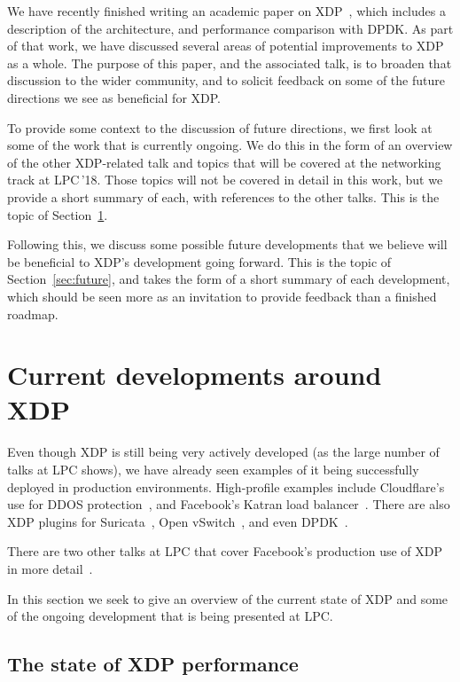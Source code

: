 \documentclass[sigconf]{acmart}
\begin{document}
We have recently finished writing an academic paper on XDP~\cite{xdp-paper},
which includes a description of the architecture, and performance comparison
with DPDK. As part of that work, we have discussed several areas of potential
improvements to XDP as a whole. The purpose of this paper, and the associated
talk, is to broaden that discussion to the wider community, and to solicit
feedback on some of the future directions we see as beneficial for XDP.

To provide some context to the discussion of future directions, we first look at
some of the work that is currently ongoing. We do this in the form of an
overview of the other XDP-related talk and topics that will be covered at the
networking track at LPC\,'18. Those topics will not be covered in detail in this
work, but we provide a short summary of each, with references to the other
talks. This is the topic of Section~\ref{sec:current}.

Following this, we discuss some possible future developments that we believe
will be beneficial to XDP's development going forward. This is the topic of
Section~\ref{sec:future}, and takes the form of a short summary of each
development, which should be seen more as an invitation to provide feedback than
a finished roadmap.

\section{Current developments around XDP}
\label{sec:current}

Even though XDP is still being very actively developed (as the large number of
talks at LPC shows), we have already seen examples of it being successfully
deployed in production environments. High-profile examples include Cloudflare's
use for DDOS protection~\cite{cloudflare-ddos}, and Facebook's Katran load
balancer~\cite{katran}. There are also XDP plugins for Suricata~\cite{suricata},
Open vSwitch~\cite{ovs-xdp}, and even DPDK~\cite{dpdk-xdp}.

There are two other talks at LPC that cover Facebook's production use of XDP in
more detail~\cite{facebook-lessons,facebook-firewall}.

In this section we seek to give an overview of the current state of XDP and some
of the ongoing development that is being presented at LPC.

\subsection{The state of XDP performance}
\label{sec:state-xdp-perf}
\end{document}
